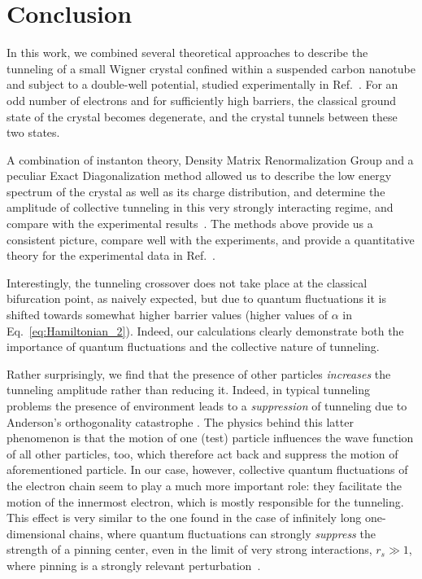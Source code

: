 \documentclass[aps, prb, floatfix, twocolumn, notitlepage, superscriptaddress, 10pt]{revtex4-2}
\newcommand{\1}{{1\hspace*{-0.5ex} \textrm{l} \hspace*{0.5ex}}}
\begin{document}
	
\section{Conclusion}\label{sec:conclusions}
In this work, we combined several theoretical approaches to describe the tunneling of 
a small Wigner crystal  confined within a suspended carbon nanotube and subject to a 
double-well potential, studied experimentally in Ref.~\cite{Shapir.2019}.  For an odd number of electrons
and for sufficiently high barriers,
 the classical ground state of the crystal becomes  degenerate,  and the crystal tunnels between these two states. 

A combination of instanton theory, Density Matrix Renormalization Group 
and  a peculiar Exact Diagonalization method allowed us to describe the low energy spectrum of the crystal
as well as its charge distribution,  and determine the amplitude of collective tunneling in this very strongly interacting regime, and compare  with the experimental results~\cite{Shapir.2019}.
The methods above provide us  a consistent picture,    compare well with the experiments, and
 provide a quantitative theory for the experimental data in Ref.~\cite{Shapir.2019}.


Interestingly, the tunneling crossover does not take place at the classical bifurcation point, as naively expected, 
but due to quantum fluctuations it is shifted towards somewhat 
higher barrier values (higher values of $\alpha$ in Eq.~\eqref{eq:Hamiltonian_2}). 
Indeed, our calculations clearly demonstrate both the importance of quantum fluctuations 
and the collective nature of tunneling. 


Rather surprisingly, we find that the presence of other 
particles \emph{increases} the tunneling amplitude rather than 
reducing it.  
Indeed, in typical tunneling problems the presence of environment leads to a 
\emph{suppression} of tunneling due to Anderson's orthogonality catastrophe \cite{Anderson1967,Leggett1987}.
The physics behind this latter phenomenon is that the motion of one (test) particle influences the 
wave function of all other particles, too, which therefore act back and suppress the motion of 
aforementioned particle. In our case, however,  collective quantum fluctuations of the electron 
chain seem to play a much more important  role: they facilitate the  motion of the innermost electron, 
which is mostly responsible for the tunneling.  This effect is very similar to 
the one found in the case of infinitely long one-dimensional chains, where quantum fluctuations can strongly 
\emph{suppress} the  strength of a pinning center, even in the limit of very strong interactions, 
$r_s \gg 1$, where  pinning  is a strongly relevant perturbation~\cite{Shklovskii.1992,KaneFisher1992}.
\end{document}
